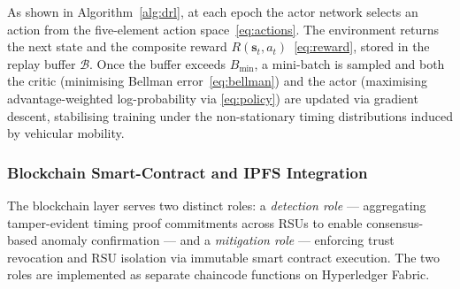 As shown in Algorithm~\ref{alg:drl}, at each epoch the
actor network selects an action from the five-element
action space~\eqref{eq:actions}. The environment returns
the next state and the composite reward
$R(\mathbf{s}_t, a_t)$~\eqref{eq:reward}, stored in the
replay buffer $\mathcal{B}$. Once the buffer exceeds
$B_{\min}$, a mini-batch is sampled and both the critic
(minimising Bellman error~\eqref{eq:bellman}) and the
actor (maximising advantage-weighted log-probability via
\eqref{eq:policy}) are updated via gradient descent,
stabilising training under the non-stationary timing
distributions induced by vehicular mobility.

\subsubsection{Blockchain Smart-Contract and IPFS Integration}
\label{sec:blockchain}

The blockchain layer serves two distinct roles: a \emph{detection role}
— aggregating tamper-evident timing proof commitments across RSUs to
enable consensus-based anomaly confirmation — and a \emph{mitigation
role} — enforcing trust revocation and RSU isolation via immutable smart
contract execution. The two roles are implemented as separate chaincode
functions on Hyperledger Fabric.

